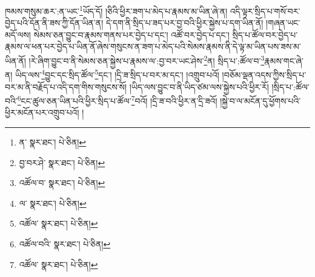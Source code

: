 ཁམས་གསུམ་ཆར་:ན་ཡང་\footnote{ན་  སྣར་ཐང་།  པེ་ཅིན། }ཡོད་དོ། །ཅིའི་ཕྱིར་ཟག་པ་མེད་པ་རྣམས་མ་ཡིན་ཞེ་ན། འདི་ལྟར་སྲིད་པ་གསོ་བར་བྱེད་པའི་དོན་ནི་ཟས་ཀྱི་དོན་ཡིན་ན། དེ་དག་ནི་སྲིད་པ་ཟད་པར་བྱ་བའི་ཕྱིར་སྐྱེས་པ་དག་ཡིན་ནོ། །གཞན་ཡང་མདོ་ལས། སེམས་ཅན་བྱུང་བ་རྣམས་གནས་པར་བྱེད་པ་དང་། འཚོ་བར་བྱེད་པ་དང་། སྲིད་པ་ཚོལ་བར་བྱེད་པ་རྣམས་ལ་ཕན་པར་བྱེད་པ་ཡིན་ནོ་ཞེས་གསུངས་ན་ཟག་པ་མེད་པའི་སེམས་རྣམས་ནི་དེ་ལྟ་མ་ཡིན་པས་ཟས་མ་ཡིན་ནོ། །རེ་ཞིག་བྱུང་བ་ནི་སེམས་ཅན་སྐྱེས་པ་རྣམས་ལ་:བྱ་བར་ཡང་ཤེས་\footnote{བྱ་བར་ཤེ་  སྣར་ཐང་།  པེ་ཅིན། }ན། སྲིད་པ་:ཚོལ་བ་\footnote{འཚོལ་བ་  སྣར་ཐང་།  པེ་ཅིན། }རྣམས་གང་ཞེ་ན། ཡིད་ལས་\footnote{ལ་  སྣར་ཐང་།  པེ་ཅིན། }བྱུང་དང་སྲིད་ཚོལ་\footnote{འཚོལ་  སྣར་ཐང་།  པེ་ཅིན། }དང་། །དྲི་ཟ་སྲིད་པ་བར་མ་དང་། །འགྲུབ་པའོ། །བཅོམ་ལྡན་འདས་ཀྱིས་སྲིད་པ་བར་མ་ནི་བརྗོད་པ་འདི་དག་གིས་གསུངས་སོ། །ཡིད་ལས་བྱུང་བ་ནི་ཡིད་ཙམ་ལས་སྐྱེས་པའི་ཕྱིར་རོ། །སྲིད་པ་:ཚོལ་བའི་\footnote{འཚོལ་བའི་  སྣར་ཐང་།  པེ་ཅིན། }ངང་ཚུལ་ཅན་ཡིན་པའི་ཕྱིར་སྲིད་པ་ཚོལ་\footnote{འཚོལ་  སྣར་ཐང་།  པེ་ཅིན། }བའོ། །དྲི་ཟ་བའི་ཕྱིར་ན་དྲི་ཟའོ། །སྐྱེ་བ་ལ་མངོན་དུ་ཕྱོགས་པའི་ཕྱིར་མངོན་པར་འགྲུབ་པའོ། །

